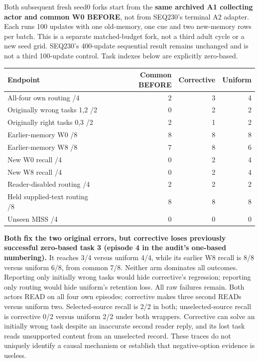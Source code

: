 \documentclass{article}
\begin{document}
Both subsequent fresh seed0 forks start from the \textbf{same archived A1 collecting
actor and common W0 BEFORE}, not from SEQ230's terminal A2 adapter. Each runs
100 updates with one old-memory, one cue and two new-memory rows per batch.
This is a separate matched-budget fork, not a third adult cycle or a new seed
grid. SEQ230's 400-update sequential result remains unchanged and is not a
third 100-update control. Task indexes below are explicitly zero-based.

\begin{center}
\small
\begin{tabular}{lrrr}
\toprule
Endpoint & Common BEFORE & Corrective & Uniform \\
\midrule
All-four own routing /4 & 2 & 3 & 4 \\
Originally wrong tasks 1,2 /2 & 0 & 2 & 2 \\
Originally right tasks 0,3 /2 & 2 & 1 & 2 \\
Earlier-memory W0 /8 & 8 & 8 & 8 \\
Earlier-memory W8 /8 & 7 & 8 & 6 \\
New W0 recall /4 & 0 & 2 & 4 \\
New W8 recall /4 & 0 & 2 & 4 \\
Reader-disabled routing /4 & 2 & 2 & 2 \\
Held supplied-text routing /8 & 8 & 8 & 8 \\
Unseen MISS /4 & 0 & 0 & 0 \\
\bottomrule
\end{tabular}
\end{center}

\textbf{Both fix the two original errors, but corrective loses previously successful
zero-based task 3 (episode 4 in the audit's one-based numbering).} It reaches
3/4 versus uniform 4/4, while its earlier W8 recall is 8/8 versus uniform 6/8,
from common 7/8. Neither arm dominates all outcomes. Reporting only initially
wrong tasks would hide corrective's regression; reporting only routing would
hide uniform's retention loss. All raw failures remain. Both actors READ on all
four own episodes; corrective makes three second READs versus uniform two.
Selected-source recall is 2/2 in both; unselected-source recall is corrective
0/2 versus uniform 2/2 under both wrappers. Corrective can solve an initially
wrong task despite an inaccurate second reader reply, and its lost task reads
unsupported content from an unselected record. These traces do not uniquely
identify a causal mechanism or establish that negative-option evidence is useless.
\end{document}
